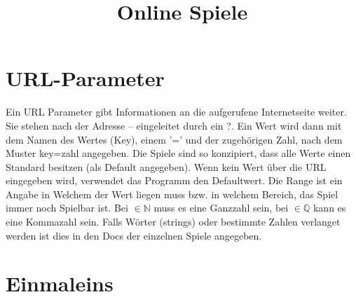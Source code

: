 \documentclass[]{article}
\title{Online Spiele}
\begin{document}
\maketitle

\section*{URL-Parameter}

\begin{multicols}{2}


Ein URL Parameter gibt Informationen an die aufgerufene Internetseite weiter. Sie stehen nach der Adresse -- eingeleitet durch ein ?.
Ein Wert wird dann mit dem Namen des Wertes (Key), einem '=' und der zugehörigen Zahl, nach dem Muster key=zahl angegeben. Die Spiele sind so konzipiert, dass alle Werte einen Standard besitzen (als Default angegeben). Wenn kein Wert über die URL eingegeben wird, verwendet das Programm den Defaultwert.
Die Range ist ein Angabe in Welchem der Wert liegen muss bzw. in welchem Bereich, das Spiel immer noch Spielbar ist. Bei $\in \mathbb{N}$ muss es eine Ganzzahl sein, bei $\in \mathbb{Q}$ kann es eine Kommazahl sein. Falls Wörter (strings) oder bestimmte Zahlen verlanget werden ist dies in den Docs der einzelnen Spiele angegeben.

\end{multicols}

\section{Einmaleins}
\end{document}

